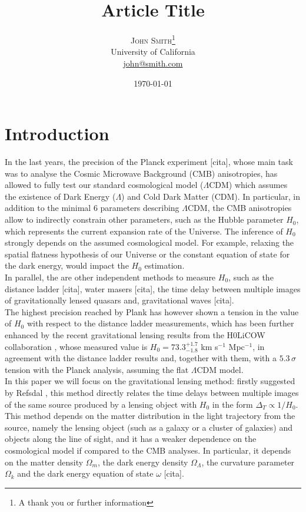 \documentclass[twoside,twocolumn]{article}
\title{Article Title} %
\author{%
\textsc{John Smith}\thanks{A thank you or further information} \\[1ex] %
\normalsize University of California \\ %
\normalsize \href{mailto:john@smith.com}{john@smith.com} %
}
\date{\today} %
\begin{document}
\maketitle


\section{Introduction}
In the last years, the precision of the Planck experiment [cita], whose main task was to analyse the Cosmic Microwave Background (CMB) anisotropies, has allowed to fully test our standard cosmological model ($\Lambda$CDM) which assumes the existence of Dark Energy ($\Lambda$) and Cold Dark Matter (CDM). In particular, in addition to the minimal 6 parameters describing $\Lambda$CDM, the CMB anisotropies allow to indirectly constrain other parameters, such as the Hubble parameter $H_0$, which represents the current expansion rate of the Universe. The inference of $H_0$ strongly depends on the assumed cosmological model. For example, relaxing the spatial flatness hypothesis of our Universe or the constant equation of state for the dark energy, would impact the $H_0$ estimation.
\\
In parallel, the are other independent methods to measure $H_0$, such as the distance ladder [cita], water masers [cita], the time delay between multiple images of gravitationally lensed quasars \cite{H0licow_I} and, gravitational waves [cita]. 
\\
The highest precision reached by Plank has however shown a tension in the value of $H_0$ with respect to the distance ladder measurements, which has been further enhanced by the recent gravitational lensing results from the H0LiCOW collaboration \cite{H0licow_XIII}, whose measured value is $H_0=73.3^{+1.7}_{-1.8}$ km s$^{-1}$ Mpc$^{-1}$, in agreement with the distance ladder results and, together with them, with a $5.3 \, \sigma$ tension with the Planck analysis, assuming the flat $\Lambda$CDM model.
\\
In this paper we will focus on the gravitational lensing method: firstly suggested by Refsdal \cite{Refsdal1964}, this method directly relates the time delays between multiple images of the same source produced by a lensing object with $H_0$ in the form $\Delta_T \propto 1/H_0$. This method depends on the matter distribution in the light trajectory from the source, namely the lensing object (such as a galaxy or a cluster of galaxies) and objects along the line of sight, and it has a weaker dependence on the cosmological model if compared to the CMB analyses. In particular, it depends on the matter density $\Omega_m$, the dark energy density $\Omega_\Lambda$, the curvature parameter $\Omega_k$ and the dark energy equation of state $\omega$ [cita].
\end{document}
